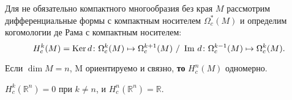 \begin{to_tas}
	Для не обязательно компактного многообразия без края $M$ рассмотрим дифференциальные формы с компактным носителем $\Omega_c^*(M)$ и определим когомологии де Рама с компактным носителем:
	\begin{equation*}
		H_c^k (M) = \mathop{\mathrm{Ker}}\nolimits d \colon \Omega_c^k (M) \mapsto \Omega^{k+1}_c (M) \ / \ \mathop{\mathrm{Im}}\nolimits \, d \colon \Omega_c^{k-1}(M) \mapsto \Omega_c^{k}(M).
	\end{equation*}

	Если $ \dim M = n$, M ориентируемо и связно, \textbf{то} $H_c^n(M)$ одномерно.
\end{to_tas}

\begin{to_tas}
	$H_c^k (\mathbb{R}^n) = 0$ при $k \neq n$, и $H_c^n(\mathbb{R}^n) = \mathbb{R} $.
\end{to_tas}
